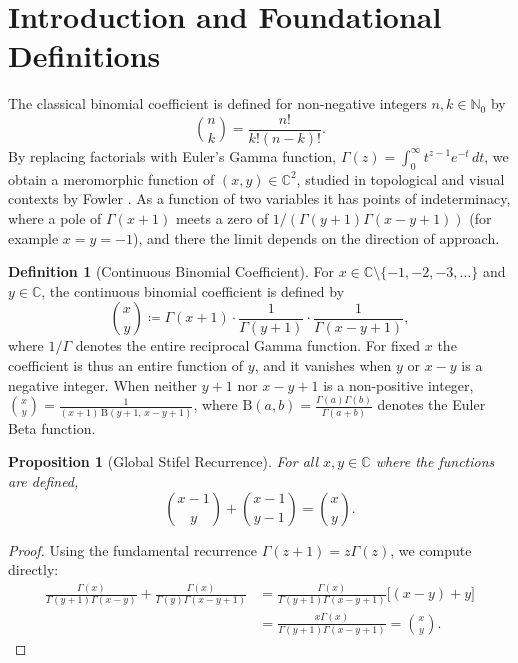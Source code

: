 \documentclass[11pt,a4paper]{article}
\theoremstyle{plain}
\newtheorem{proposition}[theorem]{Proposition}
\theoremstyle{definition}
\newtheorem{definition}[theorem]{Definition}
\theoremstyle{remark}
\numberwithin{equation}{section}
\begin{document}
\tableofcontents
\newpage

\section{Introduction and Foundational Definitions}

The classical binomial coefficient is defined for non-negative integers $n, k \in \mathbb{N}_0$ by
\begin{equation}
\binom{n}{k} = \frac{n!}{k!(n-k)!}.
\end{equation}
By replacing factorials with Euler's Gamma function, $\Gamma(z) = \int_0^\infty t^{z-1}e^{-t}\,dt$, we obtain a meromorphic function of $(x,y) \in \mathbb{C}^2$, studied in topological and visual contexts by Fowler \cite{fowler1996}. As a function of two variables it has points of indeterminacy, where a pole of $\Gamma(x+1)$ meets a zero of $1/(\Gamma(y+1)\Gamma(x-y+1))$ (for example $x = y = -1$), and there the limit depends on the direction of approach.

\begin{definition}[Continuous Binomial Coefficient]
For $x \in \mathbb{C} \setminus \{-1, -2, -3, \dots\}$ and $y \in \mathbb{C}$, the continuous binomial coefficient is defined by
\begin{equation}
\binom{x}{y} \coloneqq \Gamma(x+1)\cdot\frac{1}{\Gamma(y+1)}\cdot\frac{1}{\Gamma(x-y+1)},
\end{equation}
where $1/\Gamma$ denotes the entire reciprocal Gamma function. For fixed $x$ the coefficient is thus an entire function of $y$, and it vanishes when $y$ or $x - y$ is a negative integer. When neither $y+1$ nor $x-y+1$ is a non-positive integer, $\binom{x}{y} = \frac{1}{(x+1)\,\mathrm{B}(y+1,\, x-y+1)}$, where $\mathrm{B}(a, b) = \frac{\Gamma(a)\Gamma(b)}{\Gamma(a+b)}$ denotes the Euler Beta function.
\end{definition}

\begin{proposition}[Global Stifel Recurrence]
\label{prop:stifel}
For all $x, y \in \mathbb{C}$ where the functions are defined,
\begin{equation}
\binom{x-1}{y} + \binom{x-1}{y-1} = \binom{x}{y}.
\end{equation}
\end{proposition}
\begin{proof}
Using the fundamental recurrence $\Gamma(z+1) = z\Gamma(z)$, we compute directly:
\begin{align*}
\frac{\Gamma(x)}{\Gamma(y+1)\Gamma(x-y)} + \frac{\Gamma(x)}{\Gamma(y)\Gamma(x-y+1)} 
&= \frac{\Gamma(x)}{\Gamma(y+1)\Gamma(x-y+1)}\Big[(x-y) + y\Big] \\
&= \frac{x\Gamma(x)}{\Gamma(y+1)\Gamma(x-y+1)} = \binom{x}{y}.
\end{align*}
\end{proof}
\end{document}

